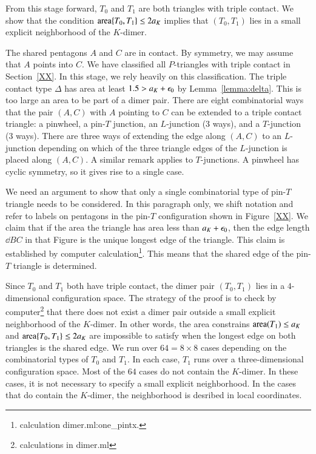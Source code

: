 From this stage forward, $T_0$ and $T_1$ are both triangles with triple contact.
We show that the condition ${\operatorname{area}}\{T_0,T_1\}\le 2a_K$ implies that
$(T_0,T_1)$ lies in a small explicit neighborhood of the $K$-dimer.

The shared pentagons $A$ and $C$ are in contact.  By symmetry, we may assume that $A$ points into $C$.
We have classified all $P$-triangles with triple contact in Section~\ref{XX}.  In this stage, we rely heavily
on this classification.   The triple contact type $\Delta$ has area at least $1.5 > a_K+\epsilon_0$ by Lemma~\ref{lemma:delta}.
This is too large an area to be part of a dimer pair.   There are eight combinatorial ways that the pair $(A,C)$ with $A$ pointing
to $C$ can be extended to a  triple contact triangle: a pinwheel, a pin-$T$ junction, an $L$-junction (3 ways), and a $T$-junction (3 ways).
There are three ways of extending the edge along $(A,C)$ to an $L$-junction depending on which of the three triangle edges of the $L$-junction
is placed along $(A,C)$.  A similar remark applies to $T$-junctions.  A pinwheel has cyclic symmetry, so it gives rise to a single case.

We need an argument to show that only a single combinatorial type of pin-$T$ triangle needs to be considered.  
In this paragraph only, we shift notation and refer
to labels on pentagons in the pin-$T$ configuration shown in Figure~\ref{XX}.  We claim that if the area the triangle has area less than
$a_K+\epsilon_0$, then the edge length $\dd{B}{C}$ in that Figure is the unique longest edge of the triangle.   
This claim is established by computer calculation\footnote{calculation dimer.ml:one\_pintx.}.  
This means that the shared edge of the pin-$T$ triangle is determined.

Since $T_0$ and $T_1$ both have triple contact, the dimer pair $(T_0,T_1)$ lies in a $4$-dimensional configuration space.
The strategy of the proof is to check by computer\footnote{calculations in dimer.ml} 
that there does not exist a  dimer pair outside a small explicit neighborhood
of the $K$-dimer.  In other words, the area constrains ${\operatorname{area}}(T_1)\le a_K$ and ${\operatorname{area}}\{T_0,T_1\}\le2a_K$ are
impossible to satisfy when the longest edge on both triangles is the shared edge.  
We run over $64 = 8\times 8$ cases depending on the combinatorial types of $T_0$ and $T_1$.  In each case,
$T_1$ runs over a three-dimensional configuration space.  Most of the $64$ cases do not contain the $K$-dimer.
In these cases, it is not necessary to specify a small explicit neighborhood.  In the cases that do contain the $K$-dimer,
the neighborhood is desribed in local coordinates.

